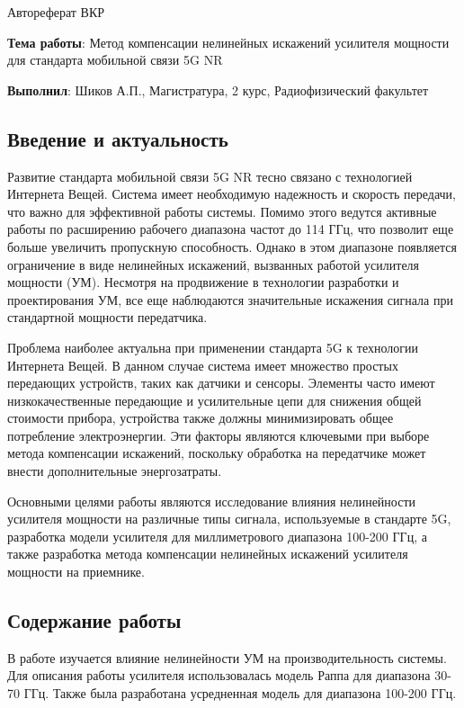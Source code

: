 
\noindent
{\Large Автореферат ВКР}

\noindent
\textbf{Тема работы}: Метод компенсации нелинейных искажений усилителя
мощности для стандарта мобильной связи 5G NR

\noindent
\textbf{Выполнил}: Шиков А.П., Магистратура, 2 курс, Радиофизический факультет

\subsection*{Введение и актуальность}
Развитие стандарта мобильной связи 5G NR тесно связано с технологией
Интернета Вещей. Система имеет необходимую надежность и скорость передачи,
что важно для эффективной работы системы. Помимо этого ведутся активные
работы по расширению рабочего диапазона частот до 114 ГГц, что позволит еще
больше увеличить пропускную способность.
Однако в этом диапазоне появляется ограничение в виде нелинейных искажений,
вызванных работой усилителя мощности (УМ). Несмотря на продвижение в
технологии разработки и проектирования УМ, все еще наблюдаются значительные
искажения сигнала при стандартной мощности передатчика.

Проблема наиболее актуальна при применении стандарта 5G к технологии
Интернета Вещей. В данном случае система имеет множество простых передающих
устройств, таких как датчики и сенсоры. Элементы часто имеют
низкокачественные передающие и усилительные цепи для снижения общей
стоимости прибора, устройства также должны минимизировать общее потребление
электроэнергии. Эти факторы являются ключевыми при выборе метода
компенсации искажений, поскольку обработка на передатчике может внести
дополнительные энергозатраты.

Основными целями работы являются исследование влияния нелинейности
усилителя мощности на различные типы сигнала, используемые в стандарте 5G,
разработка модели усилителя для миллиметрового диапазона 100-200 ГГц, а
также разработка метода компенсации нелинейных искажений усилителя мощности
на приемнике.

\subsection*{Содержание работы}
В работе изучается влияние нелинейности УМ на производительность
системы. Для описания работы усилителя использовалась модель Раппа для
диапазона 30-70 ГГц. Также была разработана усредненная модель для
диапазона 100-200 ГГц. 

